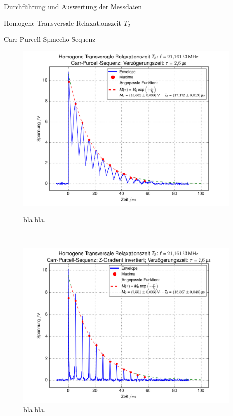 \documentclass[pdftex, a4paper,11pt, twoside, ngerman]{report}
\begin{document}
\begin{chapter}{Durchführung und Auswertung der Messdaten}
\begin{section}{
        Homogene Transversale Relaxationszeit $T_{2}$}
\begin{subsection}{Carr-Purcell-Spinecho-Sequenz}
\begin{figure}[htb]
          \begin{minipage}{.48\textwidth}
            \centering
            \includegraphics[width=\textwidth]
            {Figures/HomoTransRelax_Carr2.png}
            \caption{bla bla.}
            \label{figCarr2}
          \end{minipage}\\
          \begin{minipage}{.48\textwidth}
            \centering
            \includegraphics[width=\textwidth]
            {Figures/HomoTransRelax_Carr3.png}
            \caption{bla bla.}
            \label{figCarr3}
          \end{minipage}\quad
          \begin{minipage}{.48\textwidth}

\end{minipage}
\end{figure}
\end{subsection}
\end{section}
\end{chapter}
\end{document}
